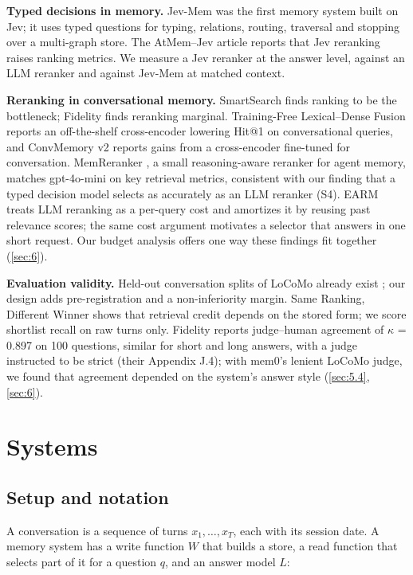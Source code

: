 \documentclass[11pt]{article}
\newcommand{\src}[1]{}
\begin{document}
\textbf{Typed decisions in memory.} Jev-Mem \citep{jiang2026jevmem} was the first memory system built on Jev; it uses typed questions for typing, relations, routing, traversal and stopping over a multi-graph store. The AtMem--Jev article \citep{taghia2026atmem} reports that Jev reranking raises ranking metrics. We measure a Jev reranker at the answer level, against an LLM reranker and against Jev-Mem at matched context.

\textbf{Reranking in conversational memory.} SmartSearch finds ranking to be the bottleneck; Fidelity finds reranking marginal. Training-Free Lexical--Dense Fusion \citep{lexdense2026} reports an off-the-shelf cross-encoder lowering Hit@1 on conversational queries, and ConvMemory v2 \citep{convmemory2026} reports gains from a cross-encoder fine-tuned for conversation. MemReranker \citep{li2026memreranker}, a small reasoning-aware reranker for agent memory, matches gpt-4o-mini on key retrieval metrics, consistent with our finding that a typed decision model selects as accurately as an LLM reranker (S4). EARM \citep{feng2026earm} treats LLM reranking as a per-query cost and amortizes it by reusing past relevance scores; the same cost argument motivates a selector that answers in one short request. Our budget analysis offers one way these findings fit together (\cref{sec:6}).

\textbf{Evaluation validity.} Held-out conversation splits of LoCoMo already exist \citep{yan2025split,useraware2026}; our design adds pre-registration and a non-inferiority margin. Same Ranking, Different Winner \citep{samerank2026} shows that retrieval credit depends on the stored form; we score shortlist recall on raw turns only. Fidelity reports judge--human agreement of $\kappa$ = 0.897\src{cite:an2026fidelity (checked against the paper's text; paper\_v3/bib\_verification.md)} on 100\src{cite:an2026fidelity (checked against the paper's text; paper\_v3/bib\_verification.md)} questions, similar for short and long answers, with a judge instructed to be strict (their Appendix J.4); with mem0's lenient LoCoMo judge, we found that agreement depended on the system's answer style (\cref{sec:5.4}, \cref{sec:6}).

\section{Systems}\label{sec:3}
\subsection{Setup and notation}\label{sec:3.1}
A conversation is a sequence of turns $x_1, \ldots, x_T$, each with its session date. A memory system has a write function $W$ that builds a store, a read function that selects part of it for a question $q$, and an answer model $L$:
\end{document}
